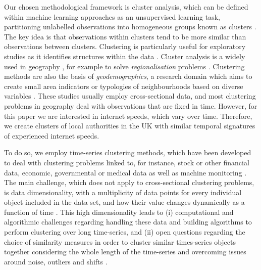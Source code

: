 \documentclass[Royal,times,sageh]{sagej}
\begin{document}
Our chosen methodological framework is cluster analysis, which can be
defined within machine learning approaches as an unsupervised learning
task, partitioning unlabelled observations into homogeneous groups known
as clusters \citep{montero2014tsclust}. The key idea is that
observations within clusters tend to be more similar than observations
between clusters. Clustering is particularly useful for exploratory
studies as it identifies structures within the data
\citep{aghabozorgi2015time}. Cluster analysis is a widely used in
geography \citep{gordon1977classification, everitt1974cluster}, for
example to solve \emph{regionalisation} problems
\citep{niesterowicz2016}. Clustering methods are also the basis of
\emph{geodemographics}, a research domain which aims to create small
area indicators or typologies of neighbourhoods based on diverse
variables \citep{SINGLETON2009289, harris2005geodemographics}. These
studies usually employ cross-sectional data, and most clustering
problems in geography deal with observations that are fixed in time.
However, for this paper we are interested in internet speeds, which vary
over time. Therefore, we create clusters of local authorities in the UK
with similar temporal signatures of experienced internet speeds.

To do so, we employ time-series clustering methods, which have been
developed to deal with clustering problems linked to, for instance,
stock or other financial data, economic, governmental or medical data as
well as machine monitoring
\citep{aggarwal2013time, aggarwal2001surprising, hyndman2015large, WARRENLIAO20051857}.
The main challenge, which does not apply to cross-sectional clustering
problems, is data dimensionality, with a multiplicity of data points for
every individual object included in the data set, and how their value
changes dynamically as a function of time \citep{aghabozorgi2015time}.
This high dimensionality leads to (i) computational and algorithmic
challenges regarding handling these data and building algorithms to
perform clustering over long time-series, and (ii) open questions
regarding the choice of similarity measures in order to cluster similar
times-series objects together considering the whole length of the
time-series and overcoming issues around noise, outliers and shifts
\citep{lin2004iterative, aghabozorgi2015time}.
\end{document}
